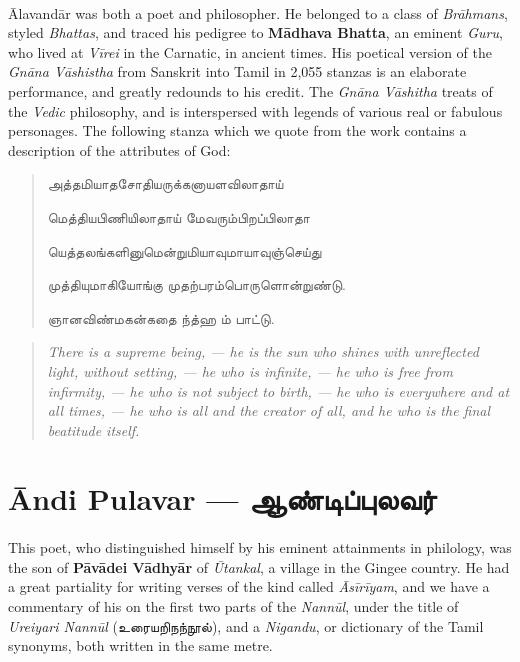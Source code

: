 \documentclass{article}
\newcommand{\TamilText}[1]{\texttamil{#1}}
\newcommand{\TamilBold}[1]{\texttamil{\textbf{#1}}}
\newcommand{\tam}[1]{\TamilText{#1}}
\newcommand{\tambold}[1]{\TamilBold{#1}}
\begin{document}
\paragraph{}
\={A}lavand\={a}r was both a poet and philosopher. He belonged to a class of \emph{Br\={a}hmans}, styled \emph{Bhattas}, and traced his pedigree to \textbf{M\={a}dhava Bhatta}, an eminent \emph{Guru}, who lived at \emph{V\={i}rei} in the Carnatic, in ancient times. His poetical version of the \emph{Gn\={a}na V\={a}shistha} from Sanskrit into Tamil in 2,055 stanzas is an elaborate performance, and greatly redounds to his credit. The \emph{Gn\={a}na V\={a}shitha} treats of the \emph{Vedic} philosophy, and is interspersed with legends of various real or fabulous personages. The following stanza which we quote from the work contains a description of the attributes of God:
\begin{quotation}\small
\tam{அத்தமியாதசோதியருக்கனாயளவிலாதாய்‌}

\tam{மெத்தியபிணியிலாதாய்‌ மேவரும்பிறப்பிலாதா}

\tam{யெத்தலங்களினுமென்றுமியாவுமாயாவுஞ்செய்து}

\tam{முத்தியுமாகியோங்கு முதற்பரம்பொருளொன்றுண்டு}.

\hspace*{15mm}\tam{ஞானவிண்மகன்கதை ந்த்ஹ ம்‌ பாட்டு}.
\end{quotation}
\begin{quotation}\small
\emph{There is a supreme being, --- he is the sun who shines with unreflected light, without setting, --- he who is infinite, --- he who is free from infirmity, --- he who is not subject to birth, --- he who is everywhere and at all times, --- he who is all and the creator of all, and he who is the final beatitude itself.}
\end{quotation}

\section{\={A}ndi Pulavar --- \tambold{ஆண்டிப்புலவர்}}
\paragraph{}
This poet, who distinguished himself by his eminent attainments in philology, was the son of \textbf{P\={a}v\={a}dei V\={a}dhy\={a}r} of \emph{\={U}tankal}, a village in the Gingee country. He had a great partiality for writing verses of the kind called \emph{\={A}s\={i}r\={i}yam}, and we have a commentary of his on the first two parts of the \emph{Nann\={u}l}, under the title of \emph{Ureiyari Nann\={u}l} (\tam{உரையறிநந்நூல்}), and a \emph{Nigandu}, or dictionary of the Tamil synonyms, both written in the same metre.
\end{document}
